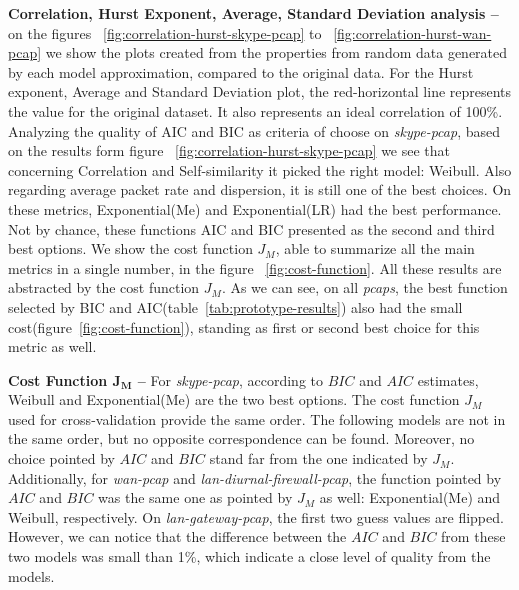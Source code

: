 \textbf{Correlation, Hurst Exponent, Average, Standard Deviation analysis --} on the figures ~\ref{fig:correlation-hurst-skype-pcap} to ~\ref{fig:correlation-hurst-wan-pcap} we show the plots created from the properties from random data generated by each model approximation, compared to the original data. For the Hurst exponent, Average and Standard Deviation plot, the red-horizontal line represents the value for the original dataset. It also represents an ideal correlation of 100\%. Analyzing the quality of AIC and BIC as criteria of choose on \textit{skype-pcap}, based on the results form figure ~\ref{fig:correlation-hurst-skype-pcap} we see that concerning Correlation and Self-similarity it picked the right model: Weibull. Also regarding average packet rate and dispersion, it is still one of the best choices. On these metrics, Exponential(Me) and Exponential(LR) had the best performance. Not by chance, these functions AIC and BIC presented as the second and third best options.  We show the cost function $J_M$, able to summarize all the main metrics in a single number, in the figure  ~\ref{fig:cost-function}. All these results are abstracted by the cost function $J_M$. As we can see, on all \textit{pcaps}, the best function selected by BIC and AIC(table~\ref{tab:prototype-results}) also had the small cost(figure~\ref{fig:cost-function}), standing as first or second best choice for this metric as well. 

\textbf{Cost Function $\mathbf{J_M}$ --} For \textit{skype-pcap}, according to $BIC$ and $AIC$ estimates, Weibull and Exponential(Me) are the two best options. The cost function $J_M$ used for cross-validation provide the same order. The following models are not in the same order, but no opposite correspondence can be found. Moreover, no choice pointed by $AIC$ and $BIC$ stand far from the one indicated by $J_M$. Additionally, for \textit{wan-pcap} and \textit{lan-diurnal-firewall-pcap}, the function pointed by $AIC$ and $BIC$ was the same one as pointed by $J_M$ as well: Exponential(Me) and Weibull, respectively. On \textit{lan-gateway-pcap}, the first two guess values are flipped. However, we can notice that the difference between the $AIC$ and $BIC$ from these two models was small than 1\%, which indicate a close level of quality from the models. 



